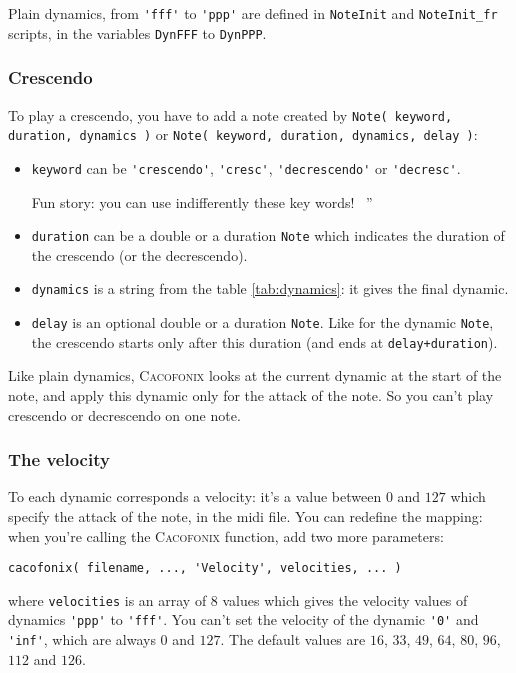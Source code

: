 \documentclass{article}
\newcommand{\cacofonix}{\textsc{Cacofonix}\xspace}
\newcommand{\note}{\lstinline!Note!\xspace}
\newenvironment{meenv}{ \par \noindent \makebox[6em][r]{ \textcolor{mecolor}{Me}: `` --~}}{~''}
\newcommand{ \me }[1]{%
\begin{meenv}%
	#1%
\end{meenv} }
\begin{document}
Plain dynamics, from \lstinline!'fff'! to \lstinline!'ppp'! are defined in \lstinline!NoteInit! and \lstinline!NoteInit_fr! scripts, in the variables \lstinline!DynFFF! to \lstinline!DynPPP!.

\subsubsection{Crescendo}
\label{sec:Crescendo}

To play a crescendo, you have to add a note created by \lstinline!Note( keyword, duration, dynamics )! or \lstinline!Note( keyword, duration, dynamics, delay )!:
\begin{itemize}
	\item \lstinline!keyword! can be \lstinline!'crescendo'!, \lstinline!'cresc'!, \lstinline!'decrescendo'! or \lstinline!'decresc'!.
		\me{Fun story: you can use indifferently these key words!}%
	\item \lstinline!duration! can be a double or a duration \note which indicates the duration of the crescendo (or the decrescendo).
	\item \lstinline!dynamics! is a string from the table \ref{tab:dynamics}: it gives the final dynamic.
	\item \lstinline!delay! is an optional double or a duration \note. Like for the dynamic \note, the crescendo starts only after this duration (and ends at \lstinline!delay+duration!).
\end{itemize}

Like plain dynamics, \cacofonix looks at the current dynamic at the start of the note, and apply this dynamic only for the attack of the note. So you can't play crescendo or decrescendo on one note.

\subsubsection{The velocity}
\label{sec:Velocity}

To each dynamic corresponds a velocity: it's a value between $0$ and $127$ which specify the attack of the note, in the midi file. You can redefine the mapping: when you're calling the \cacofonix function, add two more parameters:
\begin{lstlisting}
cacofonix( filename, ..., 'Velocity', velocities, ... )
\end{lstlisting}
where \lstinline!velocities! is an array of $8$ values which gives the velocity values of dynamics \lstinline!'ppp'! to \lstinline!'fff'!. You can't set the velocity of the dynamic \lstinline!'0'! and \lstinline!'inf'!, which are always $0$ and $127$. The default values are $16$, $33$, $49$, $64$, $80$, $96$, $112$ and $126$.
\end{document}
